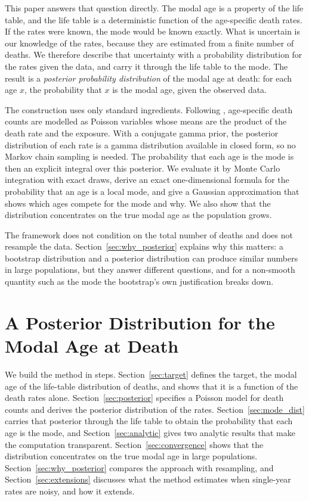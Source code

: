 \documentclass[12pt, letterpaper]{article}
\begin{document}
This paper answers that question directly. The modal age is a property of the life table, and the life table is a deterministic function of the age-specific death rates. If the rates were known, the mode would be known exactly. What is uncertain is our knowledge of the rates, because they are estimated from a finite number of deaths. We therefore describe that uncertainty with a probability distribution for the rates given the data, and carry it through the life table to the mode. The result is a \emph{posterior probability distribution} of the modal age at death: for each age $x$, the probability that $x$ is the modal age, given the observed data.

The construction uses only standard ingredients. Following \citet{brillinger1986biometrics}, age-specific death counts are modelled as Poisson variables whose means are the product of the death rate and the exposure. With a conjugate gamma prior, the posterior distribution of each rate is a gamma distribution available in closed form, so no Markov chain sampling is needed. The probability that each age is the mode is then an explicit integral over this posterior. We evaluate it by Monte Carlo integration with exact draws, derive an exact one-dimensional formula for the probability that an age is a local mode, and give a Gaussian approximation that shows which ages compete for the mode and why. We also show that the distribution concentrates on the true modal age as the population grows.

The framework does not condition on the total number of deaths and does not resample the data. Section~\ref{sec:why_posterior} explains why this matters: a bootstrap distribution and a posterior distribution can produce similar numbers in large populations, but they answer different questions, and for a non-smooth quantity such as the mode the bootstrap's own justification breaks down.

\section{A Posterior Distribution for the Modal Age at Death}
\label{sec:method}

We build the method in steps. Section~\ref{sec:target} defines the target, the modal age of the life-table distribution of deaths, and shows that it is a function of the death rates alone. Section~\ref{sec:posterior} specifies a Poisson model for death counts and derives the posterior distribution of the rates. Section~\ref{sec:mode_dist} carries that posterior through the life table to obtain the probability that each age is the mode, and Section~\ref{sec:analytic} gives two analytic results that make the computation transparent. Section~\ref{sec:convergence} shows that the distribution concentrates on the true modal age in large populations. Section~\ref{sec:why_posterior} compares the approach with resampling, and Section~\ref{sec:extensions} discusses what the method estimates when single-year rates are noisy, and how it extends.
\end{document}
